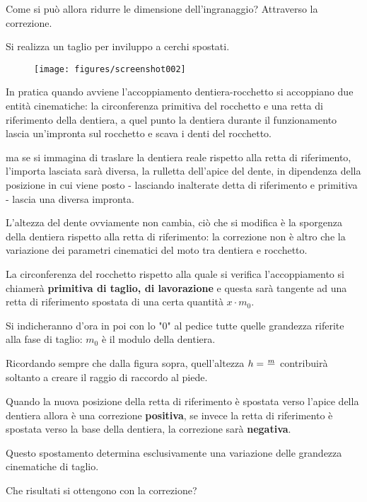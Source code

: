 \documentclass[a4paper, 15pt]{article}
\begin{document}
\begin{adjustwidth}{2in}{}
				Come si può allora ridurre le dimensione dell'ingranaggio? Attraverso la correzione. 
				
				Si realizza un taglio per inviluppo a cerchi spostati. 
				\begin{figure}[H]
					\centering
					\texttt{[image: figures/screenshot002]}
					\label{fig:screenshot002}
				\end{figure}
				
				In pratica quando avviene l'accoppiamento dentiera-rocchetto si accoppiano due entità cinematiche: la circonferenza primitiva del rocchetto e una retta di riferimento della dentiera, a quel punto la dentiera durante il funzionamento lascia un'impronta sul rocchetto e scava i denti del rocchetto. 
				
				ma se si immagina di traslare la dentiera reale rispetto alla retta di riferimento, l'importa lasciata  sarà diversa, la rulletta dell'apice del dente, in dipendenza della posizione in cui viene posto - lasciando inalterate detta di riferimento e primitiva -  lascia una diversa impronta. 
				
				L'altezza del dente ovviamente non cambia, ciò che si modifica è la sporgenza della dentiera rispetto alla retta di riferimento: la correzione non è altro che la variazione  dei parametri cinematici del moto tra dentiera e rocchetto. 
				
				La circonferenza del rocchetto rispetto alla quale si verifica l'accoppiamento si chiamerà \textbf{primitiva di taglio, di lavorazione}  e questa sarà tangente ad una retta di riferimento spostata di una certa quantità $x\cdot m_0$. 
				
				Si indicheranno d'ora in poi con lo "0" al pedice tutte quelle grandezza riferite alla fase di taglio: $m_0$ è il modulo della dentiera. 
				
				Ricordando sempre che dalla figura sopra, quell'altezza $h = {m\over}$ contribuirà soltanto a creare il raggio di raccordo al piede. 
				
				Quando la nuova posizione  della retta di riferimento è spostata verso l'apice della dentiera allora è una correzione \textbf{positiva}, se invece la retta di riferimento è spostata verso la base della dentiera, la correzione sarà \textbf{negativa}. 
				
				Questo spostamento determina esclusivamente  una variazione delle grandezza cinematiche di taglio. \newline 
				
				Che risultati si ottengono con la correzione? 
				

\end{adjustwidth}
\end{document}
